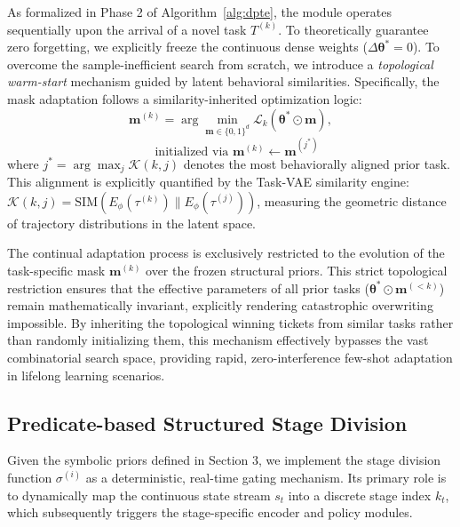 \documentclass{article}
\begin{document}
As formalized in Phase 2 of Algorithm~\ref{alg:dpte}, the module operates sequentially upon the arrival of a novel task $T^{(k)}$. 
To theoretically guarantee zero forgetting, we explicitly freeze the continuous dense weights ($\Delta \bm{\theta}^* = 0$). To overcome the sample-inefficient search from scratch, we introduce a \emph{topological warm-start} mechanism guided by latent behavioral similarities. 
Specifically, the mask adaptation follows a similarity-inherited optimization logic:
\begin{equation}
\bm{m}^{(k)} = \arg\min_{\bm{m} \in \{0, 1\}^d} \mathcal{L}_k \left( \bm{\theta}^* \odot \bm{m} \right), 
\label{eq:mask_adaptation}
\end{equation}
\begin{equation*}
\quad \text{initialized via } \bm{m}^{(k)} \leftarrow \bm{m}^{(j^*)}
\end{equation*}
where $j^* = \arg\max_j \mathcal{K}(k, j)$ denotes the most behaviorally aligned prior task. This alignment is explicitly quantified by the Task-VAE similarity engine: $\mathcal{K}(k,j) = \text{SIM}(E_\phi(\tau^{(k)}) \| E_\phi(\tau^{(j)}))$, measuring the geometric distance of trajectory distributions in the latent space.

The continual adaptation process is exclusively restricted to the evolution of the task-specific mask $\bm{m}^{(k)}$ over the frozen structural priors. 
This strict topological restriction ensures that the effective parameters of all prior tasks ($\bm{\theta}^* \odot \bm{m}^{(<k)}$) remain mathematically invariant, explicitly rendering catastrophic overwriting impossible. 
By inheriting the topological winning tickets from similar tasks rather than randomly initializing them, this mechanism effectively bypasses the vast combinatorial search space, providing rapid, zero-interference few-shot adaptation in lifelong learning scenarios.

\subsection{Predicate-based Structured Stage Division}


Given the symbolic priors defined in Section 3, we implement the stage division function $\sigma^{(i)}$ as a deterministic, real-time gating mechanism.
Its primary role is to dynamically map the continuous state stream $s_t$ into a discrete stage index $k_t$, which subsequently triggers the stage-specific encoder and policy modules.
\end{document}
